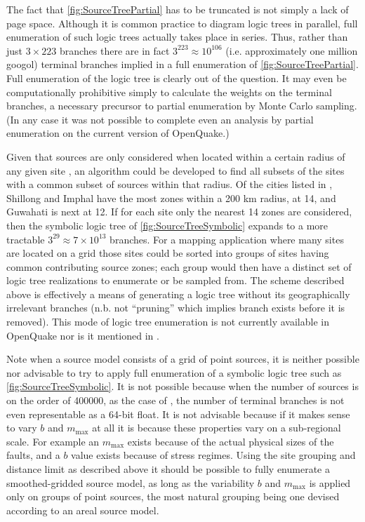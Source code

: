 \documentclass{article}
\begin{document}
The fact that \autoref{fig:SourceTreePartial} has to be truncated is not simply a lack of page space.
Although it is common practice to diagram logic trees in parallel, full enumeration of such logic trees actually takes place in series.
Thus, rather than just $3\times223$ branches there are in fact $3^{223} \approx 10^{106}$ (i.e. approximately one million googol) terminal branches implied in a full enumeration of \autoref{fig:SourceTreePartial}.
Full enumeration of the logic tree is clearly out of the question.
It may even be computationally prohibitive simply to calculate the weights on the terminal branches, a necessary precursor to partial enumeration by Monte Carlo sampling.
(In any case it was not possible to complete even an analysis by partial enumeration on the current version of OpenQuake.)

Given that sources are only considered when located within a certain radius of any given site \citep[200 km]{nath2012probabilistic}, an algorithm could be developed to find all subsets of the sites with a common subset of sources within that radius.
Of the cities listed in \citet[Table~3]{nath2012probabilistic}, Shillong and Imphal have the most zones within a 200 km radius, at 14, and Guwahati is next at 12.
If for each site only the nearest 14 zones are considered, then the symbolic logic tree of \autoref{fig:SourceTreeSymbolic} expands to a more tractable $3^{29} \approx 7\times10^{13}$ branches.
For a mapping application where many sites are located on a grid those sites could be sorted into groups of sites having common contributing source zones; each group would then have a distinct set of logic tree realizations to enumerate or be sampled from.
The scheme described above is effectively a means of generating a logic tree without its geographically irrelevant branches (n.b. not ``pruning'' which implies branch exists before it is removed).
This mode of logic tree enumeration is not currently available in OpenQuake nor is it mentioned in \cite{nath2012probabilistic}. 

Note when a source model consists of a grid of point sources, it is neither possible nor advisable to try to apply full enumeration of a symbolic logic tree such as \autoref{fig:SourceTreeSymbolic}.
It is not possible because when the number of sources is on the order of 400000, as the case of \cite{nath2012probabilistic}, the number of terminal branches is not even representable as a 64-bit float.
It is not advisable because if it makes sense to vary $b$ and $m_\text{max}$ at all it is because these properties vary on a sub-regional scale.
For example an $m_\text{max}$ exists because of the actual physical sizes of the faults, and a $b$ value exists because of stress regimes.
Using the site grouping and distance limit as described above it should be possible to fully enumerate a smoothed-gridded source model, as long as the variability $b$ and $m_\text{max}$ is applied only on groups of point sources, the most natural grouping being one devised according to an areal source model.
\end{document}
